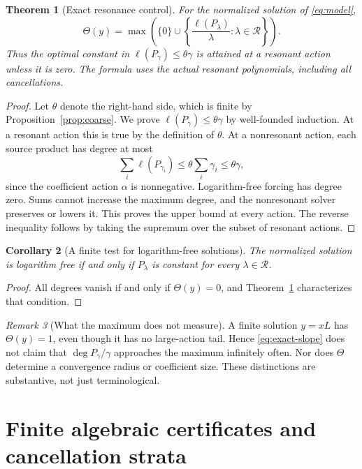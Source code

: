 \documentclass[11pt,a4paper]{article}
\numberwithin{equation}{section}
\newtheorem{theorem}{Theorem}[section]
\newtheorem{corollary}[theorem]{Corollary}
\theoremstyle{definition}
\theoremstyle{remark}
\newtheorem{remark}[theorem]{Remark}
\newcommand{\Reson}{\mathcal R}
\begin{document}
\begin{theorem}[Exact resonance control]\label{thm:slope}
For the normalized solution of \eqref{eq:model},
\begin{equation}\label{eq:exact-slope}
 \boxed{\displaystyle
 \Theta(y)=\max\left(\{0\}\cup
  \left\{\frac{\ell(P_\lambda)}{\lambda}:\lambda\in\Reson\right\}\right).}
\end{equation}
Thus the optimal constant in
\(\ell(P_\gamma)\le\theta\gamma\) is attained at a resonant action
unless it is zero. The formula uses the actual resonant polynomials,
including all cancellations.
\end{theorem}
\begin{proof}
Let \(\theta\) denote the right-hand side, which is finite by
Proposition~\ref{prop:coarse}. We prove
\(\ell(P_\gamma)\le\theta\gamma\) by well-founded induction.
At a resonant action this is true by the definition of \(\theta\).
At a nonresonant action, each source product has degree at most
\[
 \sum_i\ell(P_{\gamma_i})
 \le\theta\sum_i\gamma_i
 \le\theta\gamma,
\]
since the coefficient action \(\alpha\) is nonnegative.
Logarithm-free forcing has degree zero. Sums cannot increase the
maximum degree, and the nonresonant solver preserves or lowers it.
This proves the upper bound at every action. The reverse inequality
follows by taking the supremum over the subset of resonant actions.
\end{proof}

\begin{corollary}[A finite test for logarithm-free solutions]
\label{cor:logfree}
The normalized solution is logarithm free if and only if
\(P_\lambda\) is constant for every \(\lambda\in\Reson\).
\end{corollary}
\begin{proof}
All degrees vanish if and only if \(\Theta(y)=0\), and
Theorem~\ref{thm:slope} characterizes that condition.
\end{proof}

\begin{remark}[What the maximum does not measure]
A finite solution \(y=xL\) has \(\Theta(y)=1\), even though it has no
large-action tail. Hence \eqref{eq:exact-slope} does not claim that
\(\deg P_\gamma/\gamma\) approaches the maximum infinitely often.
Nor does \(\Theta\) determine a convergence radius or coefficient
size. These distinctions are substantive, not just terminological.
\end{remark}

\section{Finite algebraic certificates and cancellation strata}
\label{sec:certificate}
\end{document}
